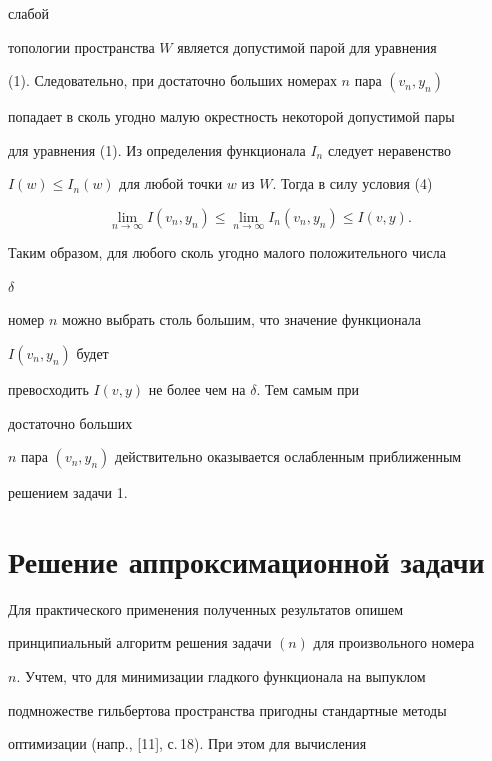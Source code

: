 \begin{pf}
слабой 


топологии пространства $W$ является допустимой парой для уравнения 


(1). Следовательно, при достаточно больших номерах $n$ пара $(v_n,y_n)$ 


попадает в сколь угодно малую окрестность некоторой допустимой пары 


для уравнения (1). Из определения функционала $I_n$ следует неравенство 


$I(w)\le I_n(w)$ для любой точки $w$ из $W$. Тогда в силу условия (4) 


$$ 


\lim_{n\to\infty}I(v_n,y_n)\le\lim_{n\to\infty}I_n(v_n,y_n) 


\le I(v,y). 


$$ 


Таким образом, для любого сколь угодно малого положительного числа 


$\delta$ 


номер $n$ можно выбрать столь большим, что значение функционала 


$I(v_n,y_n)$ будет


превосходить $I(v,y)$ не более чем на $\delta$. Тем самым при 


достаточно больших 


$n$ пара $(v_n,y_n)$ действительно оказывается ослабленным приближенным 


решением задачи 1. 


\end{pf} 


 


 


\section{Решение аппроксимационной задачи} 


 


 


Для практического применения полученных результатов опишем 


принципиальный алгоритм решения задачи $(n)$ для произвольного номера 


$n$. Учтем, что для минимизации гладкого функционала на выпуклом 


подмножестве гильбертова пространства пригодны стандартные методы 


оптимизации (напр., [11], с.\,18). При этом для вычисления 



